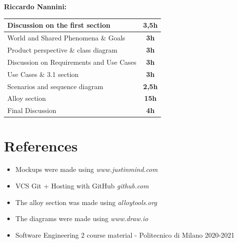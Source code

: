 \documentclass[]{article}
\begin{document}
	\textbf{\large \\ \\ Riccardo Nannini:} \\ \newline
		\begin{tabular}{|l|c|}
			\hline
			\begin{minipage}[t]{8cm}
			Discussion on the first section
			\end{minipage}
			 & 
			\textbf{3,5h} 
			\\ \hline
			\rowcolor[HTML]{DCDCDC} 
			World and Shared Phenomena \& Goals & \textbf{3h} \\ \hline
			Product perspective \& class diagram & \textbf{3h} \\ \hline
			\rowcolor[HTML]{DCDCDC} 
			Discussion on Requirements and Use Cases & \textbf{3h} \\ \hline
			Use Cases \& 3.1 section & \textbf{3h} \\ \hline
			\rowcolor[HTML]{DCDCDC} 
			Scenarios and sequence diagram & \textbf{2,5h} \\ \hline
			Alloy section & \textbf{15h} \\ \hline
			\rowcolor[HTML]{DCDCDC}
			Final Discussion & \textbf{4h} \\ \hline
		\end{tabular}
	
	\bigskip\bigskip
	\section{References}	
	\begin{itemize}
		\item Mockups were made using \textit{www.justinmind.com}
		\item VCS Git + Hosting with GitHub \textit{github.com}		
		\item The alloy section was made using \textit{alloytools.org}
		\item The diagrams were made using \textit{www.draw.io}
		\item Software Engineering 2 course material - Politecnico di Milano 2020-2021
	\end{itemize}
				
\end{document}
